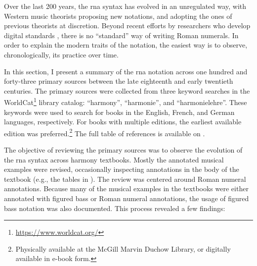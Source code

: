 

Over the last 200 years, the \gls{rna} syntax has evolved in
an unregulated way, with Western music theorists proposing
new notations, and adopting the ones of previous theorists
at discretion. Beyond recent efforts by researchers who
develop digital standards \parencite{huron1994humdrum,
neuwirth2018annotated, gotham2019romantext,
hentschel2021annotated}, there is no ``standard'' way of
writing Roman numerals. In order to explain the modern
traits of the notation, the easiest way is to observe,
chronologically, its practice over time.

In this section, I present a summary of the \gls{rna}
notation across one hundred and forty-three primary sources
between the late eighteenth and early twentieth centuries.
The primary sources were collected from three keyword
searches in the
WorldCat\footnote{\href{https://www.worldcat.org/}{https://www.worldcat.org/}}
library catalog: ``harmony'', ``harmonie'', and
``harmonielehre''. These keywords were used to search for
books in the English, French, and German languages,
respectively. For books with multiple editions, the earliest
available edition was preferred.\footnote{Physically
available at the McGill Marvin Duchow Library, or digitally
available in e-book form.} The full table of references is
available on .



The objective of reviewing the primary sources was to
observe the evolution of the \gls{rna} syntax across harmony
textbooks. Mostly the annotated musical examples were
revised, occasionally inspecting annotations in the body of
the textbook (e.g., the tables in
\textcite{kirnberger1774kunst}). The review was centered
around Roman numeral annotations. Because many of the
musical examples in the textbooks were either annotated with
figured bass or Roman numeral annotations, the usage of
figured bass notation was also documented. This process
revealed a few findings:

